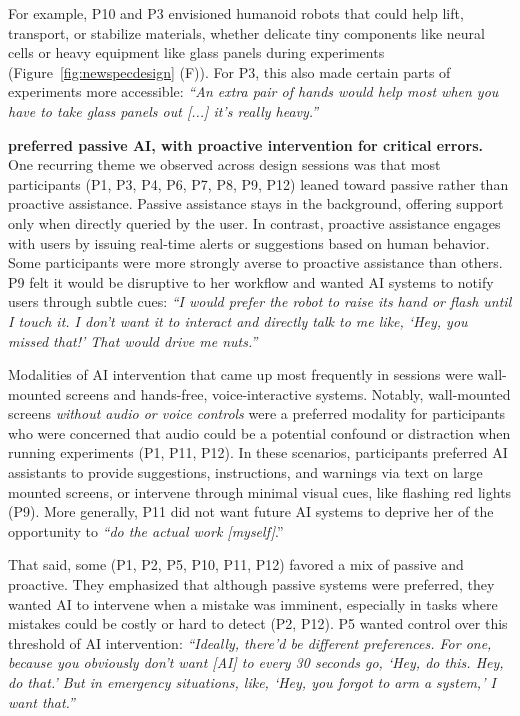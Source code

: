 For example, P10 and P3 envisioned humanoid robots that could help lift, transport, or stabilize materials, whether delicate tiny components like neural cells or heavy equipment like glass panels during experiments (Figure~\ref{fig:newspecdesign} (F)). For P3, this also made certain parts of experiments more accessible: \textit{``An extra pair of hands would help most when you have to take glass panels out [...] it's really heavy.''}


\smallskip \noindent \textbf{ preferred passive AI, with proactive intervention for critical errors.} One recurring theme we observed across design sessions was that most participants (P1, P3, P4, P6, P7, P8, P9, P12) leaned toward passive rather than proactive assistance. Passive assistance stays in the background, offering support only when directly queried by the user. In contrast, proactive assistance engages with users by issuing real-time alerts or suggestions based on human behavior. Some participants were more strongly averse to proactive assistance than others. P9 felt it would be disruptive to her workflow and wanted AI systems to notify users through subtle cues: \textit{``I would prefer the robot to raise its hand or flash until I touch it. I don't want it to interact and directly talk to me like, `Hey, you missed that!' That would drive me nuts.''}

Modalities of AI intervention that came up most frequently in sessions were wall-mounted screens and hands-free, voice-interactive systems. Notably, wall-mounted screens \emph{without audio or voice controls} were a preferred modality for participants who were concerned that audio could be a potential confound or distraction when running experiments (P1, P11, P12). In these scenarios, participants preferred AI assistants to provide suggestions, instructions, and warnings via text on large mounted screens, or intervene through minimal visual cues, like flashing red lights (P9). More generally, P11 did not want future AI systems to deprive her of the opportunity to \textit{``do the actual work [myself]}.''

That said, some (P1, P2, P5, P10, P11, P12) favored a mix of passive and proactive. They emphasized that although passive systems were preferred, they wanted AI to intervene when a mistake was imminent, especially in tasks where mistakes could be costly or hard to detect (P2, P12). P5 wanted control over this threshold of AI intervention: \textit{``Ideally, there'd be different preferences. For one, because you obviously don't want [AI] to every 30 seconds go, `Hey, do this. Hey, do that.' But in emergency situations, like, `Hey, you forgot to arm a system,' I want that.''}